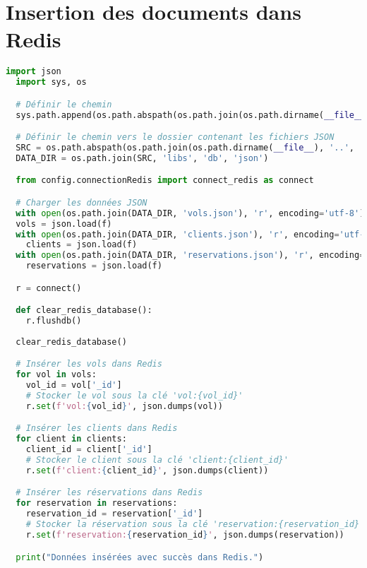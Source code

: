 \section{Insertion des documents dans Redis}
\label{ann:redis_insert}
\begin{lstlisting}[language=Python, caption=Script d'insertion des documents dans Redis, label=lst:redis_insert]
  import json
  import sys, os

  # Définir le chemin 
  sys.path.append(os.path.abspath(os.path.join(os.path.dirname(__file__), '..', '..')))

  # Définir le chemin vers le dossier contenant les fichiers JSON
  SRC = os.path.abspath(os.path.join(os.path.dirname(__file__), '..', '..'))
  DATA_DIR = os.path.join(SRC, 'libs', 'db', 'json')

  from config.connectionRedis import connect_redis as connect

  # Charger les données JSON
  with open(os.path.join(DATA_DIR, 'vols.json'), 'r', encoding='utf-8') as f: 
  vols = json.load(f)
  with open(os.path.join(DATA_DIR, 'clients.json'), 'r', encoding='utf-8') as f:
    clients = json.load(f)
  with open(os.path.join(DATA_DIR, 'reservations.json'), 'r', encoding='utf-8') as f:
    reservations = json.load(f)

  r = connect()

  def clear_redis_database():
    r.flushdb()
    
  clear_redis_database()

  # Insérer les vols dans Redis
  for vol in vols:
    vol_id = vol['_id']
    # Stocker le vol sous la clé 'vol:{vol_id}'
    r.set(f'vol:{vol_id}', json.dumps(vol))

  # Insérer les clients dans Redis
  for client in clients:
    client_id = client['_id']
    # Stocker le client sous la clé 'client:{client_id}'
    r.set(f'client:{client_id}', json.dumps(client))

  # Insérer les réservations dans Redis
  for reservation in reservations:
    reservation_id = reservation['_id']
    # Stocker la réservation sous la clé 'reservation:{reservation_id}'
    r.set(f'reservation:{reservation_id}', json.dumps(reservation))

  print("Données insérées avec succès dans Redis.")
\end{lstlisting}

